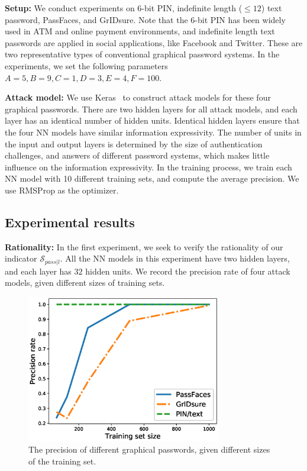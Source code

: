 \documentclass{article}
\begin{document}
\textbf{Setup:}
We conduct experiments on $6$-bit PIN, indefinite length ($\leq 12$) text password, PassFaces, and GrIDsure. 
Note that the $6$-bit PIN has been widely used in ATM and online payment environments, and indefinite length text passwords are applied in social applications, like Facebook and Twitter. These are two representative types of conventional graphical password systems. %
In the experiments, we set the following parameters $A = 5, B = 9, C = 1, D = 3, E = 4, F=100$.

\textbf{Attack model:}
We use Keras~\cite{chollet2015keras} to construct attack models for these four graphical passwords. There are two hidden layers for all attack models, and each layer has an identical number of hidden units. Identical hidden layers ensure that the four NN models have similar information expressivity. The number of units in the input and output layers is determined by the size of authentication challenges, and answers of different password systems, which makes little influence on the information expressivity. In the training process, we train each NN model with 10 different training sets, and compute the average precision. We use RMSProp as the optimizer.

\subsection{Experimental results}
\textbf{Rationality:}
In the first experiment, we seek to verify the rationality of our indicator $\mathcal{S}_{pass|l}$. All the NN models in this experiment have two hidden layers, and each layer has $32$ hidden units. We record the precision rate of four attack models, given different sizes of training sets.
  \begin{figure}[htb]
    \centering
    \includegraphics[width=8.5cm]{line}
    \caption{The precision of different graphical passwords, given different sizes of the training set. %
    } 
    \label{fig:results}
  \end{figure}
\end{document}
